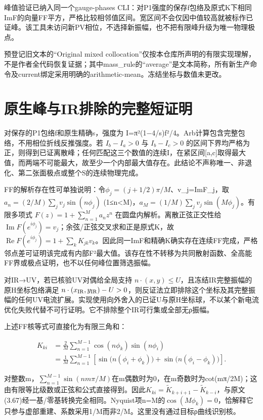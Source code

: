 \documentclass[
  10pt,
  a4paper,
]{article}
\begin{document}
峰值验证已纳入同一个gauge-phases
CLI：对P1强度的保存f包络及原式K下相同ImF的向量FF平方，严格比较相邻值区间。宽区间不会仅因中值较高就被标作已证峰。该工具未访问新PV相位，不选择新振幅，也不把有限峰升级为唯一物理极点。

预登记旧文本的``Original mixed
collocation''仅按本仓库所声明的有限实现理解，不是作者全代码恢复证据；其中mass\_rule的``average''是文本简称，所有新生产命令及current绑定采用明确的arithmetic-mean。冻结坐标与数值未更改。

\section{原生峰与IR排除的完整短证明}\label{ux539fux751fux5cf0ux4e0eirux6392ux9664ux7684ux5b8cux6574ux77edux8bc1ux660e}

对保存的P1包络f和原生精确s，强度为
I=π²(1−4/s)\textbar f\textbar²/4。Arb计算包含完整包络，不用相位折线反推强度。若
\(I_b-I_a>0\) 与 \(I_b-I_c>0\)
的区间下界均严格为正，则得到已证离散峰；任何匹配这三个数值的连续I，在紧区间{[}a,c{]}取得最大值，而两端不可能最大，故至少一个内部最大值存在。此结论不声称唯一、非退化、第二张面极点或整个S的连续物理完成。

FF的解析存在性可单独说明：令\(\phi_j=(j+1/2)\pi/M\)、v\_j=ImF\_j，取
\(a_n=(2/M)\sum_j v_j\sin(n\phi_j)\)
(1≤n\textless M)，\(a_M=(1/M)\sum_j v_j\sin(M\phi_j)\)。有限多项式
\(F(z)=1+\sum_{n=1}^M a_n z^n\)
在圆盘内解析。离散正弦正交性给\(\operatorname{Im}F(e^{i\phi_j})=v_j\)；余弦/正弦交叉求和正是原式K，故\(\operatorname{Re}F(e^{i\phi_j})=1+\sum_k K_{jk}v_k\)。因此同一ImF和精确K确实存在连续FF完成，严格邻点差可证明该完成有内部\textbar F\textbar²最大值。该存在性不转移为共同散射函数、全高能FF界或极点证明，也不以任何峰位置筛选振幅。

对IR→UV，若已核验UV对偶给全局支持
\(n\cdot(x,y)\le U\)，且冻结IR完整振幅的原H坐标包络满足
\(n\cdot(x_{\rm IR},y_{\rm IR})-U>0\)，则反证法立即排除这个坐标及其完整振幅的任何UV电流扩展。实现使用向外舍入的已证U与原H坐标球，不以某个新电流优化失败代替不可行证明。它不排除整个IR可行集或全部无ρ振幅。

上述FF核等式可直接化为有限三角和：

\[
\begin{aligned}
K_{ki}&=\frac{2}{M}\sum_{n=1}^{M-1}\cos(n\phi_k)\sin(n\phi_i)\\
&=\frac{1}{M}\sum_{n=1}^{M-1}\left[\sin\bigl(n(\phi_i+\phi_k)\bigr)+\sin\bigl(n(\phi_i-\phi_k)\bigr)\right].
\end{aligned}
\]

对整数m，\(\sum_{n=1}^{M-1}\sin(nm\pi/M)\)在m偶数时为0，在m奇数时为cot(mπ/2M)；这由有限等比级数或正弦和公式直接得到。因此\(K_{ki}=\widetilde K_{k+i+1}-\widetilde K_{k-i}\)，与原文(3.67)经一基/零基转换完全相同。Nyquist项n=M的\(\cos(M\phi_k)=0\)，恰解释它只参与虚部重建、系数采用1/M而非2/M。这里没有通过目标ρ曲线识别核。
\end{document}
